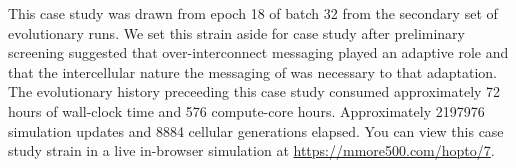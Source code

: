 This case study was drawn from epoch 18 of batch 32 from the secondary set of evolutionary runs.
We set this strain aside for case study after preliminary screening suggested that over-interconnect messaging played an adaptive role and that the intercellular nature the messaging of was necessary to that adaptation.
The evolutionary history preceeding this case study consumed approximately 72 hours of wall-clock time and 576 compute-core hours.
Approximately 2197976 simulation updates and 8884 cellular generations elapsed.
You can view this case study strain in a live in-browser simulation at \url{https://mmore500.com/hopto/7}.

